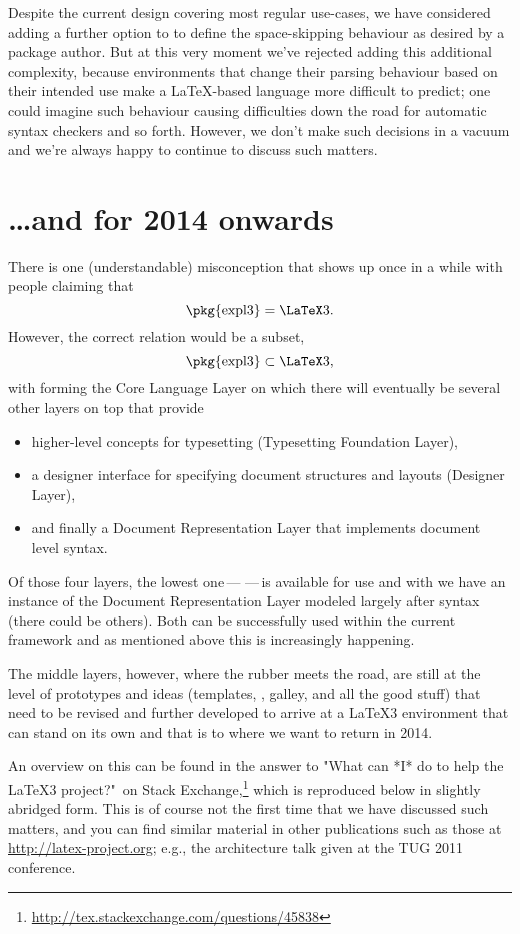 \documentclass{ltnews}
\def\Dash{\,---\,}
\begin{document}
Despite the current design covering most regular use-cases, we have considered adding a further option to  to define the space-skipping behaviour as desired by a package author.
But at this very moment we've rejected adding this additional complexity, because environments that change their parsing behaviour based on their intended use make a \LaTeX-based language more difficult to predict; one could imagine such behaviour causing difficulties down the road for automatic syntax checkers and so forth.
However, we don't make such decisions in a vacuum and we're always happy to continue to discuss such matters.


\section{\ldots and for 2014 onwards}

There is one (understandable) misconception that shows up once in a while with people claiming that
\[
         \textrm{\pkg{expl3}} = \textrm{\LaTeX3}.
\]
However, the correct relation would be a subset,
\[
         \textrm{\pkg{expl3}} \subset \textrm{\LaTeX3},
\]
with  forming the Core Language Layer on which  there will eventually be several other layers on top that \mbox{provide}
\begin{itemize}
\item higher-level concepts for typesetting (Typesetting Foundation Layer),
\item a designer interface for specifying document structures and layouts (Designer Layer),
\item and finally a Document Representation Layer that implements document level syntax.
\end{itemize}
Of those four layers, the lowest one\Dash{}\Dash is available for use and with  we have an instance of the Document Representation Layer modeled largely after \LaTeXe{} syntax (there could be others). Both can be successfully used within the current \LaTeXe{} framework and as mentioned above this is increasingly happening.

The middle layers, however, where the rubber meets the road, are still  at the level of prototypes and ideas (templates, , galley,  and all the good stuff) that need to be revised and further developed to arrive at a \LaTeX3 environment that can stand on its own and that is to where we want to return in 2014.

An overview on this can be found in the answer to "What can *I* do to help the \LaTeX3 project?"\ on Stack Exchange,\footnote{\url{http://tex.stackexchange.com/questions/45838}}
which is reproduced below in slightly abridged form.
This is of course not the first time that we have discussed such matters, and you can find similar material in other publications such as those at \url{http://latex-project.org}; e.g., the architecture talk given at the TUG 2011 conference.
\end{document}

